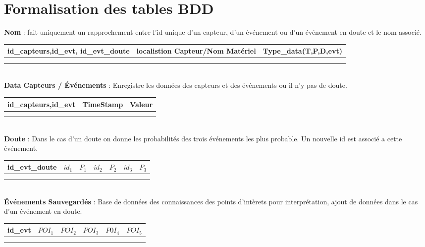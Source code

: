\documentclass[10pt,a4paper]{article}
\begin{document}
\section{Formalisation des tables BDD}
\textbf{Nom} : fait uniquement un rapprochement entre l'id unique d'un capteur, d'un événement ou d'un événement en doute et le nom associé.
\begin{table}[!h]
\begin{tabular}{|l|l|l|}
\hline
id\_capteurs,id\_evt, id\_evt\_doute & localistion Capteur/Nom Matériel & Type\_data(T,P,D,evt) \\ \hline
 &  &  \\
 &  & 
\end{tabular}
\end{table}\\
\textbf{Data Capteurs / Événements} : Enregistre les données des capteurs et des événements ou il n'y pas de doute.
\begin{table}[!h]
\begin{tabular}{|l|l|l|}
\hline
id\_capteurs,id\_evt & TimeStamp & Valeur \\ \hline
 &  &  \\
 &  & 
\end{tabular}
\end{table}\\
\textbf{Doute} : Dans le cas d'un doute on donne les probabilités des trois événements les plus probable. Un nouvelle id est associé a cette événement.
\begin{table}[!h]
\begin{tabular}{|l|l|l|l|l|l|l|}
\hline
id\_evt\_doute & $id_1$ & $P_1$ & $id_2$ & $P_2$ & $id_3$ & $P_3$  \\ \hline
 &  & &  & &  &  \\
 &  &  &  & &  &
\end{tabular}
\end{table}\\
\textbf{Événements Sauvegardés} : Base de données des connaissances des points d'intèrets pour interprétation, ajout de données dans le cas d'un événement en doute.
\begin{table}[!h]
\begin{tabular}{|l|l|l|l|l|l|}
\hline
id\_evt & $POI_1$ & $POI_2$ & $POI_3$ & $P0I_4$ & $POI_5$   \\ \hline
 &  & &  & &  \\
 &  &  &  & &
\end{tabular}
\end{table}
\end{document}
